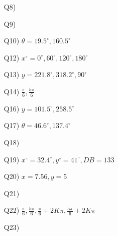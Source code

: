 \documentclass{article}
\begin{document}
\begin{enumerate}[label=Q\arabic*)]
\begin{enumerate*}[label=\roman*)]
        \end{enumerate*}
  \item[Q8)]
  \item[Q9)]
  \item[Q10)] $\theta = 19.5^{\circ}, 160.5^{\circ}$
  \item[Q12)] $x^{\circ} = 0^{\circ}, 60^{\circ}, 120^{\circ}, 180^{\circ}$
  \item[Q13)] $y = 221.8^{\circ}, 318.2^{\circ}, 90^{\circ}$
  \item[Q14)] $\frac{\pi}{6}, \frac{5\pi}{6}$
  \item[Q16)] $y = 101.5^{\circ}, 258.5^{\circ}$
  \item[Q17)] $\theta = 46.6^{\circ}, 137.4^{\circ}$
  \item[Q18)]
  \item[Q19)] $x^{\circ} = 32.4^{\circ}, y^{\circ}=41^{\circ}, DB=133$
  \item[Q20)] $x = 7.56, y=5$
  \item[Q21)]
  \item[Q22)] $\frac{\pi}{6}, \frac{5\pi}{6}, \frac{\pi}{6}+2K\pi, \frac{5\pi}{6}+2K\pi$
  \item[Q23)]
\end{enumerate}
\end{document}
